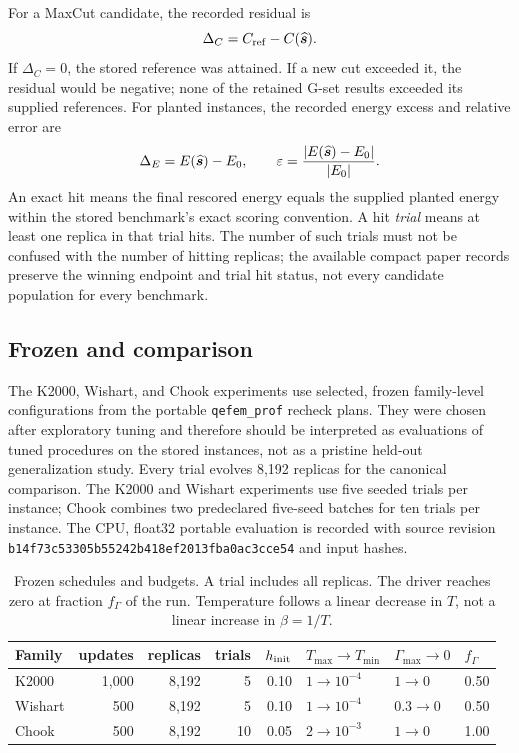 For a MaxCut candidate, the recorded residual is
\begin{equation}
 \Delta_C=C_{\rm ref}-C(\widehat{\bm s}).
 \label{eq:cutgap}
\end{equation}
If $\Delta_C=0$, the stored reference was attained. If a new cut exceeded
it, the residual would be negative; none of the retained G-set results
exceeded its supplied references. For planted instances, the recorded
energy excess and relative error are
\begin{equation}
 \Delta_E=E(\widehat{\bm s})-E_0,
 \qquad
 \varepsilon=\frac{|E(\widehat{\bm s})-E_0|}{|E_0|}.
 \label{eq:plantedmetric}
\end{equation}
An exact hit means the final rescored energy equals the supplied planted
energy within the stored benchmark's exact scoring convention. A hit
\emph{trial} means at least one replica in that trial hits. The number of
such trials must not be confused with the number of hitting replicas;
the available compact paper records preserve the winning endpoint and
trial hit status, not every candidate population for every benchmark.

\subsection{Frozen \QeFEM{} and \LQA{} comparison}

The K2000, Wishart, and Chook experiments use selected, frozen
family-level configurations from the portable \texttt{qefem\_prof}
recheck plans. They were chosen after exploratory tuning and therefore
should be interpreted as evaluations of tuned procedures on the stored
instances, not as a pristine held-out generalization study. Every
\QeFEM{} trial evolves 8,192 replicas for the canonical comparison. The
K2000 and Wishart experiments use five seeded trials per instance; Chook
combines two predeclared five-seed batches for ten trials per instance.
The CPU, float32 portable evaluation is recorded with source revision
\texttt{b14f73c53305b55242b418ef2013fba0ac3cce54} and input hashes.

\begin{table}[t]
\centering\small
\caption{Frozen \QeFEM{} schedules and budgets. A trial includes all
replicas. The driver reaches zero at fraction $f_\Gamma$ of the run.
Temperature follows a linear decrease in $T$, not a linear increase in
$\beta=1/T$.}
\label{tab:frozen-schedules}
\begin{tabular}{lrrrrlll}
\toprule
Family & updates & replicas & trials & $h_{\rm init}$
 & $T_{\max}\to T_{\min}$ & $\Gamma_{\max}\to0$ & $f_\Gamma$\\
\midrule
K2000 & 1,000 & 8,192 & 5 & 0.10 & $1\to10^{-4}$ & $1\to0$ & 0.50\\
Wishart & 500 & 8,192 & 5 & 0.10 & $1\to10^{-4}$ & $0.3\to0$ & 0.50\\
Chook & 500 & 8,192 & 10 & 0.05 & $2\to10^{-3}$ & $1\to0$ & 1.00\\
\bottomrule
\end{tabular}
\end{table}

